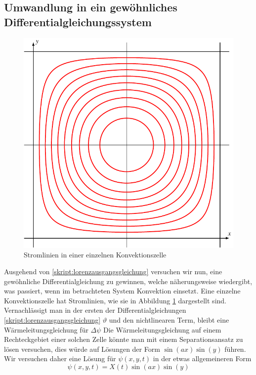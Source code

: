 \subsection{Umwandlung in ein gewöhnliches Differentialgleichungssystem\label{subsection:umwandlung}}
\begin{figure}
\centering
\includegraphics{chapters/2/konvektion.pdf}
\caption{Stromlinien in einer einzelnen Konvektionszelle
\label{skript:stromlinien konvektion}}
\end{figure}
Ausgehend von
\eqref{skript:lorenzausgangsgleichung}
versuchen wir nun, eine gewöhnliche Differentialgleichung zu gewinnen,
welche näherungsweise wiedergibt, was passiert, wenn im betrachteten
System Konvektion einsetzt.
Eine einzelne Konvektionszelle hat Stromlinien, wie sie in Abbildung
\ref{skript:stromlinien konvektion}
dargestellt sind.
Vernachlässigt man in der
ersten der Differentialgleichungen
\eqref{skript:lorenzausgangsgleichung}
$\vartheta$ und den nichtlinearen Term, bleibt eine Wärmeleitungsgleichung
für $\Delta \psi$
Die Wärmeleitungsgleichung auf einem Rechteckgebiet 
einer solchen Zelle könnte man mit einem Separationsansatz zu lösen
versuchen, dies würde auf Lösungen der Form
$\sin(ax)\sin(y)$
führen.
Wir versuchen daher eine Lösung für $\psi(x,y,t)$ in der etwas
allgemeineren Form
\begin{equation}
\psi(x,y,t)
=
X(t) \sin(ax)\sin(y)
\label{skript:psiansatz}
\end{equation}

